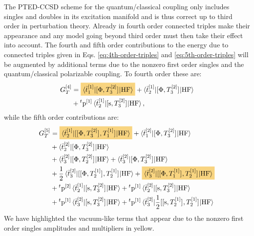 The \acrshort{PTED}-\acrshort{CCSD} scheme for the quantum/classical coupling
only includes singles and doubles in its excitation manifold and is thus
correct up to third order in perturbation theory.
Already in fourth order connected triples make their appearance and any
model going beyond third order must then take their effect into account.
The fourth and fifth order contributions to the energy due to connected
triples given in Eqs.
\eqref{eq:4th-order-triples} and \eqref{eq:5th-order-triples} will be
augmented by additional terms due to the nonzero first order singles and
the quantum/classical polarizable coupling.
To fourth order these are:
\begin{equation}\label{eq:triples-fourth-order}
  \begin{aligned}
  G_T^{[4]} &=
  \highlight{PMS130}{\braket{\tbar{1}^{[1]} | \commutator{\Phi}{T_3^{[2]}} | \mathrm{HF}}}
  + \braket{\tbar{2}^{[1]}| \commutator{\Phi}{T_3^{[2]}} | \mathrm{HF}} \\
  &+ {}^t\p^{[1]}\braket{\tbar{2}^{[1]} | \commutator{\s}{T_3^{[2]}} |
  \mathrm{HF}},
  \end{aligned}
\end{equation}
while the fifth order contributions are:
\begin{equation}\label{eq:triples-fifth-order}
  \begin{aligned}
  G_T^{[5]} &=
    \highlight{PMS130}{
    \braket{\tbar{2}^{[1]} |
    \commutator{\commutator{\Phi}{T_3^{[2]}}}{T_1^{[1]}}
    | \mathrm{HF}}
    }
    +
    \braket{\tbar{1}^{[2]} | \commutator{\Phi}{T_3^{[2]}} | \mathrm{HF}} \\
  &+ \braket{\tbar{2}^{[2]} | \commutator{\Phi}{T_3^{[2]}} | \mathrm{HF}} \\
  &+ \braket{\tbar{3}^{[2]} | \commutator{\Phi}{T_2^{[2]}} | \mathrm{HF}}
  + \braket{\tbar{3}^{[2]} | \commutator{\Phi}{T_3^{[2]}} | \mathrm{HF}}
  \\
    &+
    \frac{1}{2}\braket{\tbar{3}^{[2]} |
    \commutator{\commutator{\Phi}{T_2^{[1]}}}{T_2^{[1]}}
    | \mathrm{HF}}
  +
  \highlight{PMS130}{
    \braket{\tbar{3}^{[2]} |
    \commutator{\commutator{\Phi}{T_1^{[1]}}}{T_2^{[1]}}
    | \mathrm{HF}}
   }
   \\
   &+
    {}^t\p^{[2]}\braket{\tbar{2}^{[1]} | \commutator{\s}{T_3^{[2]}} | \mathrm{HF}}
  + {}^t\p^{[1]}\braket{\tbar{2}^{[2]} | \commutator{\s}{T_3^{[2]}} | \mathrm{HF}} \\
  &+ {}^t\p^{[1]}\braket{\tbar{3}^{[2]} | \commutator{\s}{T_3^{[2]}} | \mathrm{HF}}
  + {}^t\p^{[1]}\braket{\tbar{3}^{[2]} |
    \frac{1}{2}\commutator{\commutator{\s}{T_2^{[1]}}}{T_2^{[1]}}
    | \mathrm{HF}}
  \end{aligned}
\end{equation}
We have highlighted the vacuum-like terms that appear due to the nonzero
first order singles amplitudes and multipliers in yellow.


